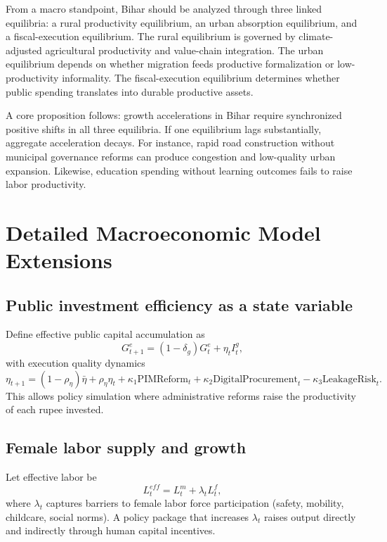 \documentclass[preprint,12pt]{elsarticle}
\begin{document}
From a macro standpoint, Bihar should be analyzed through three linked equilibria: a rural productivity equilibrium, an urban absorption equilibrium, and a fiscal-execution equilibrium. The rural equilibrium is governed by climate-adjusted agricultural productivity and value-chain integration. The urban equilibrium depends on whether migration feeds productive formalization or low-productivity informality. The fiscal-execution equilibrium determines whether public spending translates into durable productive assets.

A core proposition follows: growth accelerations in Bihar require synchronized positive shifts in all three equilibria. If one equilibrium lags substantially, aggregate acceleration decays. For instance, rapid road construction without municipal governance reforms can produce congestion and low-quality urban expansion. Likewise, education spending without learning outcomes fails to raise labor productivity.

\section{Detailed Macroeconomic Model Extensions}
\subsection{Public investment efficiency as a state variable}
Define effective public capital accumulation as
\begin{equation}
G_{t+1}^e = (1-\delta_g)G_t^e + \eta_t I_t^g,
\end{equation}
with execution quality dynamics
\begin{equation}
\eta_{t+1} = (1-\rho_\eta)\bar{\eta} + \rho_\eta \eta_t + \kappa_1 \text{PIMReform}_t + \kappa_2 \text{DigitalProcurement}_t - \kappa_3 \text{LeakageRisk}_t.
\end{equation}
This allows policy simulation where administrative reforms raise the productivity of each rupee invested.

\subsection{Female labor supply and growth}
Let effective labor be
\begin{equation}
L_t^{eff} = L_t^m + \lambda_t L_t^f,
\end{equation}
where $\lambda_t$ captures barriers to female labor force participation (safety, mobility, childcare, social norms). A policy package that increases $\lambda_t$ raises output directly and indirectly through human capital incentives.
\end{document}
